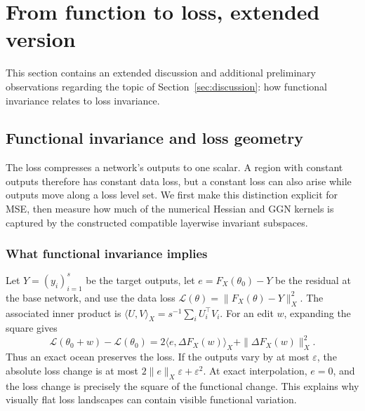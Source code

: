 \section{From function to loss, extended version}
\label{app:applications}
This section contains an extended discussion and additional preliminary observations regarding the topic of  Section~\ref{sec:discussion}: how functional invariance relates to loss invariance.

\subsection{Functional invariance and loss geometry}
\label{app:hessian}
The loss compresses a network's outputs to one scalar. A region with constant outputs therefore has constant data loss, but a constant loss can also arise while outputs move along a loss level set. We first make this distinction explicit for MSE, then measure how much of the numerical Hessian and GGN kernels is captured by the constructed compatible layerwise invariant subspaces.

\subsubsection{What functional invariance implies}
Let $Y=(y_i)_{i=1}^s$ be the target outputs, let $e=F_X(\theta_0)-Y$ be the residual at the base network, and use the data loss $\mathcal L(\theta)=\|F_X(\theta)-Y\|_X^2$. The associated inner product is $\langle U,V\rangle_X=s^{-1}\sum_i U_i^\top V_i$. For an edit $w$, expanding the square gives
\begin{equation}
 \mathcal L(\theta_0+w)-\mathcal L(\theta_0)
 =2\langle e,\Delta F_X(w)\rangle_X+\|\Delta F_X(w)\|_X^2.
 \label{eq:application-loss-change}
\end{equation}
Thus an exact ocean preserves the loss. If the outputs vary by at most $\varepsilon$, the absolute loss change is at most $2\|e\|_X\varepsilon+\varepsilon^2$. At exact interpolation, $e=0$, and the loss change is precisely the square of the functional change. This explains why visually flat loss landscapes can contain visible functional variation.

